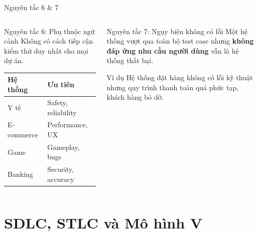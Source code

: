 \documentclass[aspectratio=169,12pt]{beamer}
\begin{document}
\begin{frame}{Nguyên tắc 6 \& 7}
  \begin{columns}
    \begin{block}{Nguyên tắc 6: Phụ thuộc ngữ cảnh}
      Không có cách tiếp cận kiểm thử duy nhất cho mọi dự án.

      \vspace{0.3em}
      \begin{tabular}{ll}
        \small\textbf{Hệ thống} & \small\textbf{Ưu tiên} \\
        \midrule
        \small Y tế & \small Safety, reliability \\
        \small E-commerce & \small Performance, UX \\
        \small Game & \small Gameplay, bugs \\
        \small Banking & \small Security, accuracy \\
      \end{tabular}
    \end{block}

    \begin{block}{Nguyên tắc 7: Ngụy biện không có lỗi}
      Một hệ thống vượt qua toàn bộ test case nhưng \textbf{không đáp ứng
      nhu cầu người dùng} vẫn là hệ thống thất bại.

      \vspace{0.3em}
      \begin{exampleblock}{\small Ví dụ}
        \small Hệ thống đặt hàng không có lỗi kỹ thuật nhưng
        quy trình thanh toán quá phức tạp, khách hàng bỏ dở.
      \end{exampleblock}
    \end{block}
  \end{columns}
\end{frame}

\section{SDLC, STLC và Mô hình V}
\end{document}
